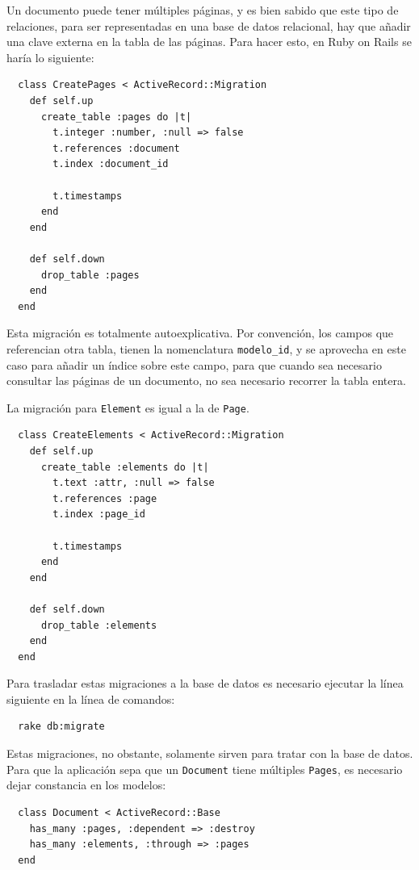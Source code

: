 Un documento puede tener múltiples páginas, y es bien sabido que este tipo de relaciones, para ser representadas en una base de datos relacional, hay que añadir una clave externa en la tabla de las páginas. Para hacer esto, en Ruby on Rails se haría lo siguiente:

\begin{verbatim}
  class CreatePages < ActiveRecord::Migration
    def self.up
      create_table :pages do |t|
        t.integer :number, :null => false
        t.references :document
        t.index :document_id
        
        t.timestamps
      end
    end

    def self.down
      drop_table :pages
    end
  end
\end{verbatim}

Esta migración es totalmente autoexplicativa. Por convención, los campos que referencian otra tabla, tienen la nomenclatura \texttt{modelo\_id}, y se aprovecha en este caso para añadir un índice sobre este campo, para que cuando sea necesario consultar las páginas de un documento, no sea necesario recorrer la tabla entera.

La migración para \texttt{Element} es igual a la de \texttt{Page}.

\begin{verbatim}
  class CreateElements < ActiveRecord::Migration
    def self.up
      create_table :elements do |t|
        t.text :attr, :null => false 
        t.references :page
        t.index :page_id

        t.timestamps
      end
    end

    def self.down
      drop_table :elements
    end
  end
\end{verbatim}

Para trasladar estas migraciones a la base de datos es necesario ejecutar la línea siguiente en la línea de comandos:

\begin{verbatim}
  rake db:migrate
\end{verbatim}

Estas migraciones, no obstante, solamente sirven para tratar con la base de datos. Para que la aplicación sepa que un \texttt{Document} tiene múltiples \texttt{Pages}, es necesario dejar constancia en los modelos:

\begin{verbatim}
  class Document < ActiveRecord::Base
    has_many :pages, :dependent => :destroy
    has_many :elements, :through => :pages
  end
\end{verbatim}

